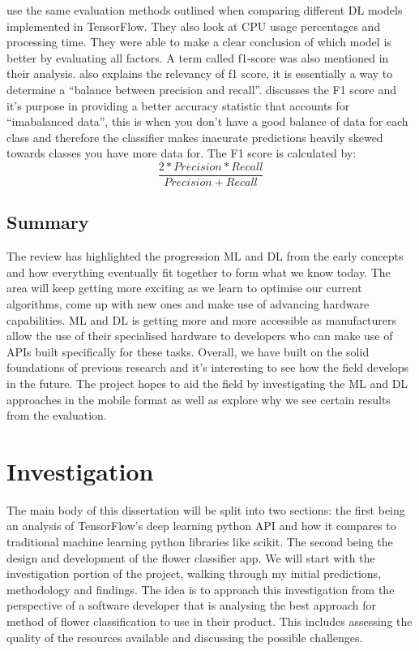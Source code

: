 \documentclass[12pt,a4paper]{report}
\begin{document}
\citet{Chockwanich} use the same evaluation methods outlined when comparing different DL models 
implemented in TensorFlow. They also look at CPU usage percentages and processing time. They were able to make a clear 
conclusion of which model is better by evaluating all factors. A term called f1-score was also mentioned in their 
analysis. \citet{shung2018} also explains the relevancy of f1 score, it is essentially a way to determine a “balance between
precision and recall”. \citet{kors2021} discusses the F1 score and it's purpose in providing a better 
accuracy statistic that accounts for “imabalanced data”, this is when you don't have a good balance of data for each 
class and therefore the classifier makes inacurate predictions heavily skewed towards classes you have more data for. 
The F1 score is calculated by:
\[\frac{2*Precision*Recall}{Precision + Recall}\]

\section{Summary}

The review has highlighted the progression ML and DL from the early concepts and how everything eventually fit 
together to form what we know today. The area will keep getting more exciting as we learn to optimise our current 
algorithms, come up with new ones and make use of advancing hardware capabilities. ML and DL is getting more and more 
accessible as manufacturers allow the use of their specialised hardware to developers who can make use of APIs built 
specifically for these tasks. Overall, we have built on the solid foundations of previous research and it's interesting 
to see how the field develops in the future. The project hopes to aid the field by investigating the ML and DL 
approaches in the mobile format as well as explore why we see certain results from the evaluation.

\clearpage

\chapter{Investigation}

The main body of this dissertation will be split into two sections: the first being an analysis of TensorFlow's deep 
learning python API and how it compares to traditional machine learning python libraries like scikit. The second being 
the design and development of the flower classifier app. We will start with the investigation portion of the project,
walking through my initial predictions, methodology and findings. The idea is to approach this investigation from the 
perspective of a software developer that is analysing the best approach for method of flower classification to use in 
their product. This includes assessing the quality of the resources available and discussing the possible challenges.
\end{document}
